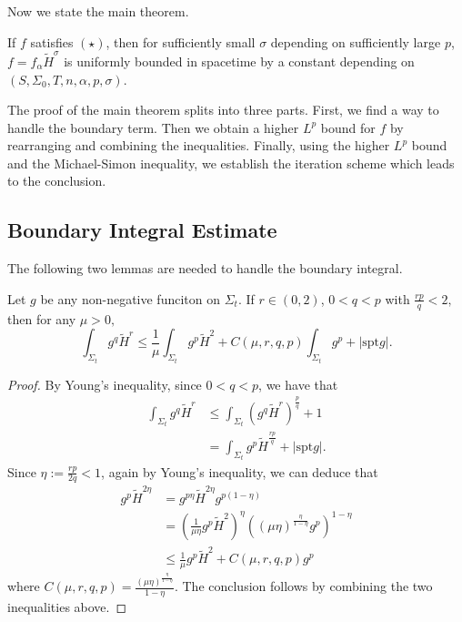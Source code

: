 Now we state the main theorem.

\begin{theorem}
    If $f$ satisfies $(\star)$, then for sufficiently small $\sigma $ depending on sufficiently large $p$, $f=f_{\alpha }\tilde{H}^{\sigma }$ is uniformly bounded in spacetime by a constant depending on $(S,\Sigma _0,T,n,\alpha ,p,\sigma )$. 
\end{theorem}

The proof of the main theorem splits into three parts. First, we find a way to handle the boundary term. Then we obtain a higher $L^p$ bound for $f$ by rearranging and combining the inequalities. Finally, using the higher $L^p$ bound and the Michael-Simon inequality, we establish the iteration scheme which leads to the conclusion.

\subsection{Boundary Integral Estimate}

The following two lemmas are needed to handle the boundary integral.

\begin{lemma}\label{HSquare}
    Let $g$ be any non-negative funciton on $\Sigma_t.$ If $r \in (0,2)$, $0<q<p$ with $\frac{rp }{q}<2,$ then for any $\mu >0,$ 
    \[
        \int_{\Sigma_t} g^q \tilde{H}^r \leq \frac{1}{\mu }\int_{\Sigma_t} g^p \tilde{H}^2+C(\mu ,r,q,p )\int_{\Sigma_t} g^p + \left| \mathrm{spt } g \right|.    
    \]
\end{lemma}
\begin{proof}
    By Young's inequality, since $0<q<p$, we have that 
    \begin{equation*}
    \begin{split}
        \int_{\Sigma_t} g^q \tilde{H}^r 
    &\leq \int_{\Sigma_t} (g^q \tilde{H}^r)^{\frac{p}{q}}+1  \\
    &= \int_{\Sigma_t} g^p \tilde{H}^{\frac{rp }{q}}+\left| \mathrm{spt } g \right|.
    \end{split}
    \end{equation*} 
    Since $\eta := \frac{rp }{2q}<1$, again by Young's inequality, we can deduce that
    \begin{equation*}
    \begin{split}
        g^p \tilde{H}^{2\eta} 
    &= g^{p \eta }\tilde{H}^{2\eta}g^{p \left( 1-\eta \right) } \\
    &= \left( \frac{1}{\mu \eta  }g^{p}\tilde{H}^2 \right) ^{\eta} \left( (\mu \eta )^{\frac{\eta}{1-\eta } }g^p\right)^{1-\eta }\\
    & \leq \frac{1}{\mu }g^p\tilde{H}^2+C(\mu ,r,q,p)g^p
    \end{split}
    \end{equation*} 
    where $C(\mu ,r,q,p)=\frac{(\mu \eta )^{\frac{\eta}{1-\eta } }}{1-\eta }$.
    The conclusion follows by combining the two inequalities above.
\end{proof}


